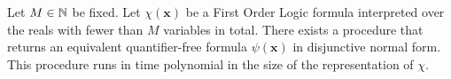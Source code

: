 \begin{theorem}
\label{thm:renegar}
Let $M \in \mathbb{N}$ be fixed. Let $\chi(\mathbf{x})$ be a First Order Logic formula interpreted over the reals with fewer than $M$ variables in total. There exists a procedure that returns an equivalent quantifier-free formula $\psi(\mathbf{x})$ in disjunctive normal form. This procedure runs in time polynomial in the size of the representation of $\chi$.
\end{theorem} 

